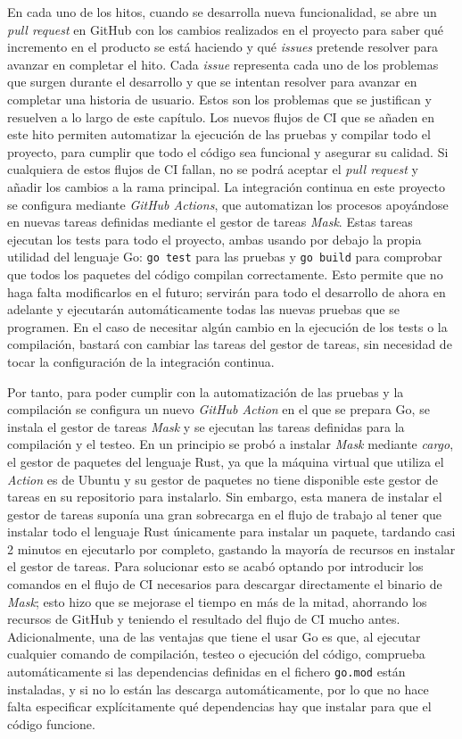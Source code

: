 En cada uno de los hitos, cuando se desarrolla nueva funcionalidad, se abre un
\textit{pull request} en GitHub con los cambios realizados en el proyecto para
saber qué incremento en el producto se está haciendo y qué \textit{issues}
pretende resolver para avanzar en completar el hito. Cada \textit{issue}
representa cada uno de los problemas que surgen durante el desarrollo y que se
intentan resolver para avanzar en completar una historia de usuario. Estos son
los problemas que se justifican y resuelven a lo largo de este capítulo. Los
nuevos flujos de CI que se añaden en este hito permiten automatizar la ejecución
de las pruebas y compilar todo el proyecto, para cumplir que todo el código sea
funcional y asegurar su calidad. Si cualquiera de estos flujos de CI fallan, no
se podrá aceptar el \textit{pull request} y añadir los cambios a la rama
principal. La integración continua en este proyecto se configura mediante
\textit{GitHub Actions}, que automatizan los procesos apoyándose en nuevas
tareas definidas mediante el gestor de tareas \textit{Mask}. Estas tareas
ejecutan los tests para todo el proyecto, ambas usando por debajo la propia
utilidad del lenguaje Go: \texttt{go test} para las pruebas y \texttt{go build}
para comprobar que todos los paquetes del código compilan correctamente. Esto
permite que no haga falta modificarlos en el futuro; servirán para todo el
desarrollo de ahora en adelante y ejecutarán automáticamente todas las nuevas
pruebas que se programen. En el caso de necesitar algún cambio en la ejecución
de los tests o la compilación, bastará con cambiar las tareas del gestor de
tareas, sin necesidad de tocar la configuración de la integración continua.

Por tanto, para poder cumplir con la automatización de las pruebas y la
compilación se configura un nuevo \textit{GitHub Action} en el que se prepara
Go, se instala el gestor de tareas \textit{Mask} y se ejecutan las tareas
definidas para la compilación y el testeo. En un principio se probó a instalar
\textit{Mask} mediante \textit{cargo}, el gestor de paquetes del lenguaje Rust,
ya que la máquina virtual que utiliza el \textit{Action} es de Ubuntu y su
gestor de paquetes no tiene disponible este gestor de tareas en su repositorio
para instalarlo. Sin embargo, esta manera de instalar el gestor de tareas
suponía una gran sobrecarga en el flujo de trabajo al tener que instalar todo el
lenguaje Rust únicamente para instalar un paquete, tardando casi 2 minutos en
ejecutarlo por completo, gastando la mayoría de recursos en instalar el gestor
de tareas. Para solucionar esto se acabó optando por introducir los comandos en
el flujo de CI necesarios para descargar directamente el binario de
\textit{Mask}; esto hizo que se mejorase el tiempo en más de la mitad, ahorrando
los recursos de GitHub y teniendo el resultado del flujo de CI mucho antes.
Adicionalmente, una de las ventajas que tiene el usar Go es que, al ejecutar
cualquier comando de compilación, testeo o ejecución del código, comprueba
automáticamente si las dependencias definidas en el fichero \texttt{go.mod}
están instaladas, y si no lo están las descarga automáticamente, por lo que no
hace falta especificar explícitamente qué dependencias hay que instalar para que
el código funcione.

